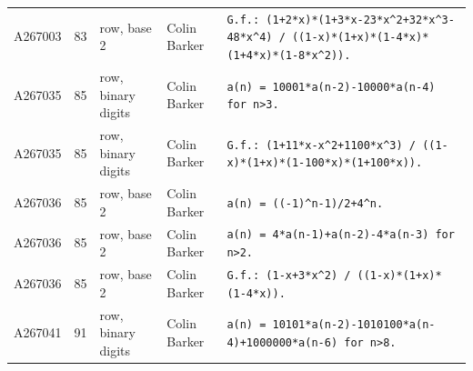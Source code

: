 \documentclass[11pt]{article}
\theoremstyle{definition}
\theoremstyle{remark}
\begin{document}
{\begin{longtable}{p{1.3cm}p{0.7cm}p{2.4cm}p{2.3cm}p{7.3cm}}
A267003 & 83 & row, base 2 & Colin Barker & \texttt{G.f.: \allowbreak{}(1+\allowbreak{}2*\allowbreak{}x)\allowbreak{}*\allowbreak{}(1+\allowbreak{}3*\allowbreak{}x-\allowbreak{}23*\allowbreak{}x\^{}2+\allowbreak{}32*\allowbreak{}x\^{}3-\allowbreak{}48*\allowbreak{}x\^{}4)\allowbreak{} \allowbreak{}/\allowbreak{} \allowbreak{}((1-\allowbreak{}x)\allowbreak{}*\allowbreak{}(1+\allowbreak{}x)\allowbreak{}*\allowbreak{}(1-\allowbreak{}4*\allowbreak{}x)\allowbreak{}*\allowbreak{}(1+\allowbreak{}4*\allowbreak{}x)\allowbreak{}*\allowbreak{}(1-\allowbreak{}8*\allowbreak{}x\^{}2)\allowbreak{})\allowbreak{}.} \\
A267035 & 85 & row, binary digits & Colin Barker & \texttt{a(n)\allowbreak{} \allowbreak{}=\allowbreak{} \allowbreak{}10001*\allowbreak{}a(n-\allowbreak{}2)\allowbreak{}-\allowbreak{}10000*\allowbreak{}a(n-\allowbreak{}4)\allowbreak{} \allowbreak{}for \allowbreak{}n>3.} \\
A267035 & 85 & row, binary digits & Colin Barker & \texttt{G.f.: \allowbreak{}(1+\allowbreak{}11*\allowbreak{}x-\allowbreak{}x\^{}2+\allowbreak{}1100*\allowbreak{}x\^{}3)\allowbreak{} \allowbreak{}/\allowbreak{} \allowbreak{}((1-\allowbreak{}x)\allowbreak{}*\allowbreak{}(1+\allowbreak{}x)\allowbreak{}*\allowbreak{}(1-\allowbreak{}100*\allowbreak{}x)\allowbreak{}*\allowbreak{}(1+\allowbreak{}100*\allowbreak{}x)\allowbreak{})\allowbreak{}.} \\
A267036 & 85 & row, base 2 & Colin Barker & \texttt{a(n)\allowbreak{} \allowbreak{}=\allowbreak{} \allowbreak{}((-\allowbreak{}1)\allowbreak{}\^{}n-\allowbreak{}1)\allowbreak{}/\allowbreak{}2+\allowbreak{}4\^{}n.} \\
A267036 & 85 & row, base 2 & Colin Barker & \texttt{a(n)\allowbreak{} \allowbreak{}=\allowbreak{} \allowbreak{}4*\allowbreak{}a(n-\allowbreak{}1)\allowbreak{}+\allowbreak{}a(n-\allowbreak{}2)\allowbreak{}-\allowbreak{}4*\allowbreak{}a(n-\allowbreak{}3)\allowbreak{} \allowbreak{}for \allowbreak{}n>2.} \\
A267036 & 85 & row, base 2 & Colin Barker & \texttt{G.f.: \allowbreak{}(1-\allowbreak{}x+\allowbreak{}3*\allowbreak{}x\^{}2)\allowbreak{} \allowbreak{}/\allowbreak{} \allowbreak{}((1-\allowbreak{}x)\allowbreak{}*\allowbreak{}(1+\allowbreak{}x)\allowbreak{}*\allowbreak{}(1-\allowbreak{}4*\allowbreak{}x)\allowbreak{})\allowbreak{}.} \\
A267041 & 91 & row, binary digits & Colin Barker & \texttt{a(n)\allowbreak{} \allowbreak{}=\allowbreak{} \allowbreak{}10101*\allowbreak{}a(n-\allowbreak{}2)\allowbreak{}-\allowbreak{}1010100*\allowbreak{}a(n-\allowbreak{}4)\allowbreak{}+\allowbreak{}1000000*\allowbreak{}a(n-\allowbreak{}6)\allowbreak{} \allowbreak{}for \allowbreak{}n>8.} \\

\end{longtable}}
\end{document}
